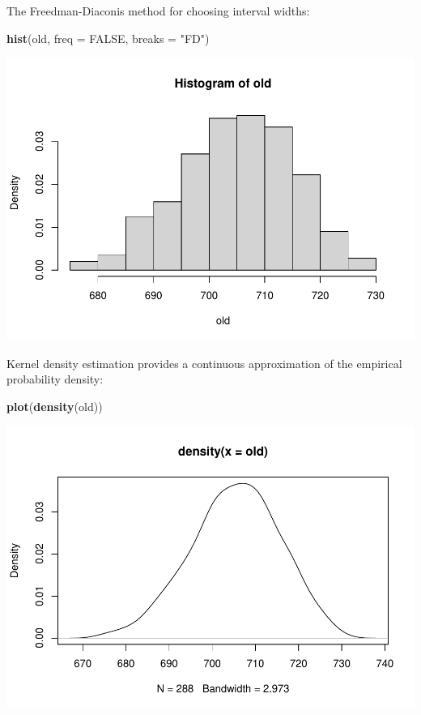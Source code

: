 \documentclass[
]{article}
\newenvironment{Shaded}{\begin{snugshade}}{\end{snugshade}}
\newcommand{\AttributeTok}[1]{\textcolor[rgb]{0.13,0.29,0.53}{#1}}
\newcommand{\ConstantTok}[1]{\textcolor[rgb]{0.56,0.35,0.01}{#1}}
\newcommand{\FunctionTok}[1]{\textcolor[rgb]{0.13,0.29,0.53}{\textbf{#1}}}
\newcommand{\NormalTok}[1]{#1}
\newcommand{\StringTok}[1]{\textcolor[rgb]{0.31,0.60,0.02}{#1}}
\begin{document}
The Freedman-Diaconis method for choosing interval widths:

\begin{Shaded}
\begin{Highlighting}[]
\FunctionTok{hist}\NormalTok{(old, }\AttributeTok{freq =} \ConstantTok{FALSE}\NormalTok{, }\AttributeTok{breaks =} \StringTok{"FD"}\NormalTok{)}
\end{Highlighting}
\end{Shaded}

\includegraphics{EDA_files/figure-latex/unnamed-chunk-17-1.pdf}

Kernel density estimation provides a continuous approximation of the
empirical probability density:

\begin{Shaded}
\begin{Highlighting}[]
\FunctionTok{plot}\NormalTok{(}\FunctionTok{density}\NormalTok{(old))}
\end{Highlighting}
\end{Shaded}

\includegraphics{EDA_files/figure-latex/unnamed-chunk-18-1.pdf}
\end{document}
